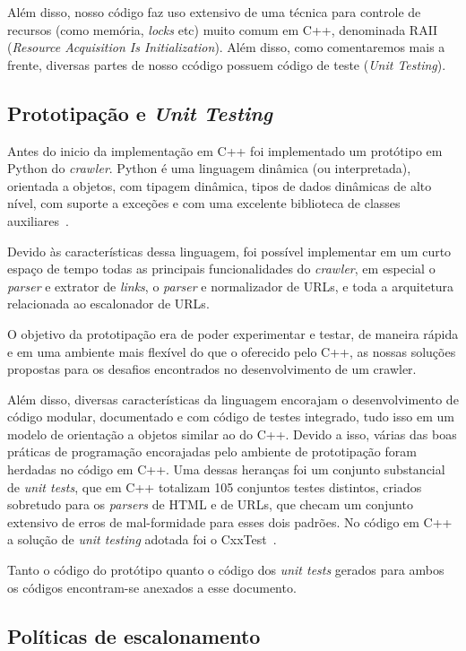 \documentclass[10pt,twocolumn]{article}
\begin{document}
Além disso, nosso código faz uso extensivo de uma técnica para controle
de recursos (como memória, \emph{locks} etc)  muito comum em C++,
denominada RAII (\emph{Resource Acquisition Is Initialization}).
Além disso, como comentaremos mais a frente, diversas partes de nosso
ccódigo possuem código de teste (\emph{Unit Testing}).

\subsection{Prototipação e \emph{Unit Testing}}

Antes do inicio da implementação em C++ foi implementado um protótipo em
Python do \emph{crawler}. Python é uma linguagem dinâmica (ou
interpretada), orientada a objetos, com tipagem dinâmica, tipos de dados
dinâmicas de alto nível, com suporte a exceções e com uma excelente
biblioteca de classes auxiliares~\cite{pythonlang}.

Devido às características dessa linguagem, foi possível implementar em
um curto espaço de tempo todas as principais funcionalidades do
\emph{crawler}, em especial o \emph{parser} e extrator de \emph{links},
o \emph{parser} e normalizador de URLs, e toda a arquitetura relacionada
ao escalonador de URLs.

O objetivo da prototipação era de poder experimentar e testar, de
maneira rápida e em uma ambiente mais flexível do que o oferecido pelo
C++, as nossas soluções propostas para os desafios encontrados no
desenvolvimento de um crawler.

Além disso, diversas características da linguagem encorajam o
desenvolvimento de código modular, documentado e com código de testes
integrado, tudo isso em um modelo de orientação a objetos
similar ao do C++. Devido a isso, várias das boas práticas de
programação encorajadas pelo ambiente de prototipação foram herdadas no
código em C++. Uma dessas heranças foi um conjunto substancial de \emph{unit
tests}, que em C++ totalizam 105 conjuntos testes distintos,
 criados sobretudo para os
\emph{parsers} de HTML e de URLs, que checam um conjunto extensivo de
erros de mal-formidade para esses dois padrões. No código em C++ a
solução de \emph{unit testing} adotada foi o CxxTest~\cite{cxxtest}.

Tanto o código do protótipo quanto o código dos \emph{unit tests} gerados para
ambos os códigos encontram-se anexados a esse documento.

\subsection{Políticas de escalonamento}
\end{document}
